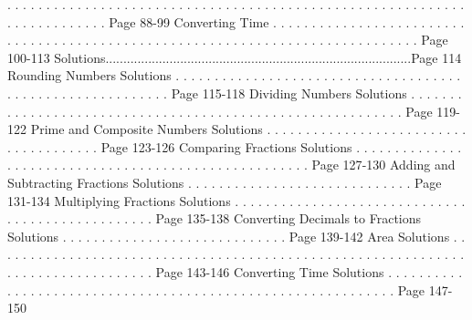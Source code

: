 \documentclass{article}%
\begin{document}
.%
.%
.%
.%
.%
.%
.%
.%
.%
.%
.%
.%
.%
.%
.%
.%
.%
.%
.%
.%
.%
.%
.%
.%
.%
.%
.%
.%
.%
.%
.%
.%
.%
.%
.%
.%
.%
.%
.%
.%
.%
.%
.%
.%
.%
.%
.%
.%
.%
.%
.%
.%
.%
.%
.%
.%
.%
.%
.%
.%
.%
.%
.%
.%
.%
.%
.%
.%
.%
.%
.%
.%
Page 88{-}99%
\newline%
Converting Time%
.%
.%
.%
.%
.%
.%
.%
.%
.%
.%
.%
.%
.%
.%
.%
.%
.%
.%
.%
.%
.%
.%
.%
.%
.%
.%
.%
.%
.%
.%
.%
.%
.%
.%
.%
.%
.%
.%
.%
.%
.%
.%
.%
.%
.%
.%
.%
.%
.%
.%
.%
.%
.%
.%
.%
.%
.%
.%
.%
.%
.%
.%
.%
.%
.%
.%
.%
.%
.%
.%
.%
.%
.%
.%
.%
.%
.%
.%
Page 100{-}113%
\newline%
Solutions......................................................................................Page 114%
\newline%
Rounding Numbers Solutions%
.%
.%
.%
.%
.%
.%
.%
.%
.%
.%
.%
.%
.%
.%
.%
.%
.%
.%
.%
.%
.%
.%
.%
.%
.%
.%
.%
.%
.%
.%
.%
.%
.%
.%
.%
.%
.%
.%
.%
.%
.%
.%
.%
.%
.%
.%
.%
.%
.%
.%
.%
.%
.%
.%
.%
.%
.%
.%
Page 115{-}118%
\newline%
Dividing Numbers Solutions%
.%
.%
.%
.%
.%
.%
.%
.%
.%
.%
.%
.%
.%
.%
.%
.%
.%
.%
.%
.%
.%
.%
.%
.%
.%
.%
.%
.%
.%
.%
.%
.%
.%
.%
.%
.%
.%
.%
.%
.%
.%
.%
.%
.%
.%
.%
.%
.%
.%
.%
.%
.%
.%
.%
.%
.%
.%
.%
Page 119{-}122%
\newline%
Prime and Composite Numbers Solutions%
.%
.%
.%
.%
.%
.%
.%
.%
.%
.%
.%
.%
.%
.%
.%
.%
.%
.%
.%
.%
.%
.%
.%
.%
.%
.%
.%
.%
.%
.%
.%
.%
.%
.%
.%
.%
.%
.%
Page 123{-}126%
\newline%
Comparing Fractions Solutions%
.%
.%
.%
.%
.%
.%
.%
.%
.%
.%
.%
.%
.%
.%
.%
.%
.%
.%
.%
.%
.%
.%
.%
.%
.%
.%
.%
.%
.%
.%
.%
.%
.%
.%
.%
.%
.%
.%
.%
.%
.%
.%
.%
.%
.%
.%
.%
.%
.%
.%
.%
.%
.%
Page 127{-}130%
\newline%
Adding and Subtracting Fractions Solutions%
.%
.%
.%
.%
.%
.%
.%
.%
.%
.%
.%
.%
.%
.%
.%
.%
.%
.%
.%
.%
.%
.%
.%
.%
.%
.%
.%
.%
.%
Page 131{-}134%
\newline%
Multiplying Fractions Solutions%
.%
.%
.%
.%
.%
.%
.%
.%
.%
.%
.%
.%
.%
.%
.%
.%
.%
.%
.%
.%
.%
.%
.%
.%
.%
.%
.%
.%
.%
.%
.%
.%
.%
.%
.%
.%
.%
.%
.%
.%
.%
.%
.%
.%
.%
.%
.%
.%
.%
Page 135{-}138%
\newline%
Converting Decimals to Fractions Solutions%
.%
.%
.%
.%
.%
.%
.%
.%
.%
.%
.%
.%
.%
.%
.%
.%
.%
.%
.%
.%
.%
.%
.%
.%
.%
.%
.%
.%
.%
Page 139{-}142%
\newline%
Area Solutions%
.%
.%
.%
.%
.%
.%
.%
.%
.%
.%
.%
.%
.%
.%
.%
.%
.%
.%
.%
.%
.%
.%
.%
.%
.%
.%
.%
.%
.%
.%
.%
.%
.%
.%
.%
.%
.%
.%
.%
.%
.%
.%
.%
.%
.%
.%
.%
.%
.%
.%
.%
.%
.%
.%
.%
.%
.%
.%
.%
.%
.%
.%
.%
.%
.%
.%
.%
.%
.%
.%
.%
.%
.%
.%
.%
.%
.%
.%
.%
.%
Page 143{-}146%
\newline%
Converting Time Solutions%
.%
.%
.%
.%
.%
.%
.%
.%
.%
.%
.%
.%
.%
.%
.%
.%
.%
.%
.%
.%
.%
.%
.%
.%
.%
.%
.%
.%
.%
.%
.%
.%
.%
.%
.%
.%
.%
.%
.%
.%
.%
.%
.%
.%
.%
.%
.%
.%
.%
.%
.%
.%
.%
.%
.%
.%
.%
.%
.%
.%
Page 147{-}150%
\newline%
\newpage
\end{document}

